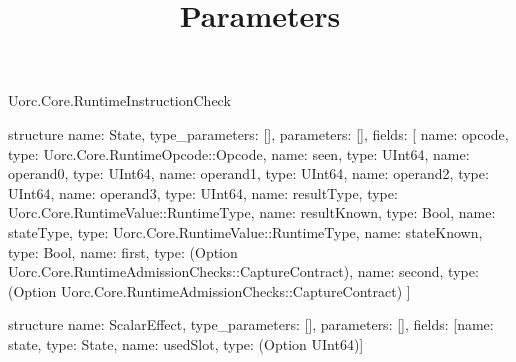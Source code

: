 \begin{lexlean}{Uorc.Core.RuntimeInstructionCheck}
\title{Parameters}
\begin{semanticmodule}
structure{
  name: State,
  type_parameters: [],
  parameters: [],
  fields: [
    {name: opcode, type: Uorc.Core.RuntimeOpcode::Opcode},
    {name: seen, type: UInt64},
    {name: operand0, type: UInt64},
    {name: operand1, type: UInt64},
    {name: operand2, type: UInt64},
    {name: operand3, type: UInt64},
    {name: resultType, type: Uorc.Core.RuntimeValue::RuntimeType},
    {name: resultKnown, type: Bool},
    {name: stateType, type: Uorc.Core.RuntimeValue::RuntimeType},
    {name: stateKnown, type: Bool},
    {name: first, type: (Option Uorc.Core.RuntimeAdmissionChecks::CaptureContract)},
    {name: second, type: (Option Uorc.Core.RuntimeAdmissionChecks::CaptureContract)}
  ]
}

structure{
  name: ScalarEffect,
  type_parameters: [],
  parameters: [],
  fields: [{name: state, type: State}, {name: usedSlot, type: (Option UInt64)}]
}


\end{semanticmodule}
\end{lexlean}
